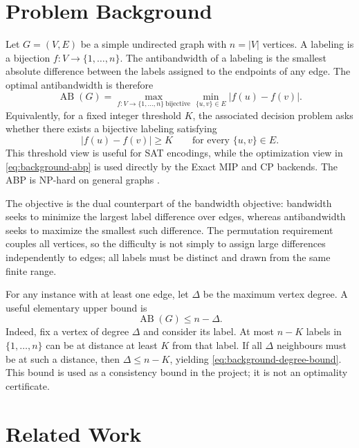 \section{Problem Background}
\label{sec:background}

Let $G=(V,E)$ be a simple undirected graph with $n=|V|$ vertices. A labeling is a bijection $f:V\rightarrow\{1,\ldots,n\}$. The antibandwidth of a labeling is the smallest absolute difference between the labels assigned to the endpoints of any edge. The optimal antibandwidth is therefore
\begin{equation}
  \operatorname{AB}(G)
  = \max_{f:V\rightarrow\{1,\ldots,n\}\ \mathrm{bijective}}
       \min_{\{u,v\}\in E}|f(u)-f(v)|.
  \label{eq:background-abp}
\end{equation}
Equivalently, for a fixed integer threshold $K$, the associated decision problem asks whether there exists a bijective labeling satisfying
\begin{equation}
  |f(u)-f(v)|\ge K
  \qquad \text{for every }\{u,v\}\in E.
  \label{eq:background-abp-decision}
\end{equation}
This threshold view is useful for SAT encodings, while the optimization view in \eqref{eq:background-abp} is used directly by the Exact MIP and CP backends. The ABP is NP-hard on general graphs \citep{Sinnl2021}.

The objective is the dual counterpart of the bandwidth objective: bandwidth seeks to minimize the largest label difference over edges, whereas antibandwidth seeks to maximize the smallest such difference. The permutation requirement couples all vertices, so the difficulty is not simply to assign large differences independently to edges; all labels must be distinct and drawn from the same finite range.

For any instance with at least one edge, let $\Delta$ be the maximum vertex degree. A useful elementary upper bound is
\begin{equation}
  \operatorname{AB}(G)\le n-\Delta.
  \label{eq:background-degree-bound}
\end{equation}
Indeed, fix a vertex of degree $\Delta$ and consider its label. At most $n-K$ labels in $\{1,\ldots,n\}$ can be at distance at least $K$ from that label. If all $\Delta$ neighbours must be at such a distance, then $\Delta\le n-K$, yielding \eqref{eq:background-degree-bound}. This bound is used as a consistency bound in the project; it is not an optimality certificate.

\section{Related Work}
\label{sec:related-work}

